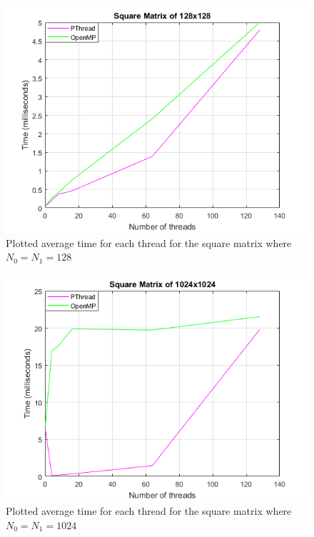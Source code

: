 \documentclass[10pt, conference]{IEEEtran}
\begin{document}
\begin{appendices}
\begin{figure}[h!]
\renewcommand{\thefigure}{\arabic{figure}}
\centering
\includegraphics[scale=0.8]{Graph128.png}
\caption{Plotted average time for each thread for the square matrix where $N_0 = N_1 = 128$}
\label{Graph128}
\end{figure}

\begin{figure}[h!]
\renewcommand{\thefigure}{\arabic{figure}}
\centering
\includegraphics[scale=0.8]{Graph1024.png}
\caption{Plotted average time for each thread for the square matrix where $N_0 = N_1 = 1024$}
\label{Graph1024}
\end{figure}


\end{appendices}
\end{document}
